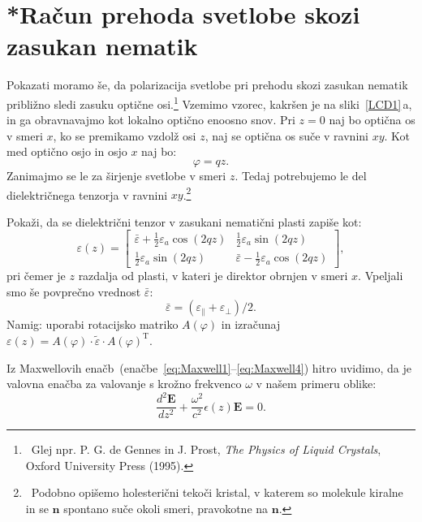 \section{*Račun prehoda svetlobe skozi zasukan nematik}
Pokazati moramo še, da polarizacija svetlobe pri prehodu skozi zasukan nematik 
približno sledi zasuku optične osi.\footnote{~Glej npr. P. G. de Gennes in J. Prost, 
{\it The Physics of Liquid Crystals}, Oxford University Press (1995).}
Vzemimo vzorec, kakršen je na sliki~\ref{LCD1}\,a, in ga obravnavajmo
kot lokalno optično enoosno snov. Pri $z=0$ naj bo optična
os v smeri $x$, ko se premikamo vzdolž osi $z$, naj se optična os suče
v ravnini $xy$. Kot med optično osjo in osjo $x$ naj bo:
\begin{equation}
\varphi=qz.
\label{7.58}
\end{equation}
Zanimajmo se le za širjenje svetlobe v smeri $z$. 
Tedaj potrebujemo le del dielektričnega
tenzorja v ravnini $xy$.\footnote{~Podobno opišemo holesterični tekoči kristal, v
katerem so molekule kiralne in se $\mathbf{n}$ spontano suče okoli
smeri, pravokotne na $\mathbf{n}$.} 

\begin{naloga}
Pokaži, da se dielektrični tenzor v zasukani nematični plasti zapiše kot:
\begin{equation}
\varepsilon (z)=\left[\begin{array}{cc}
\bar{\varepsilon}+\frac{1}{2}\varepsilon_{a}\cos(2qz) & \frac{1}{2}\varepsilon_{a}\sin(2qz)\\
\frac{1}{2}\varepsilon_{a}\sin(2qz) & \bar{\varepsilon}-\frac{1}{2}\varepsilon_{a}\cos(2qz)
\end{array}\right]\!\!,
\label{7.59}
\end{equation}
pri čemer je $z$ razdalja od plasti, v kateri je direktor
obrnjen v smeri $x$. Vpeljali smo še povprečno vrednost $\bar{\varepsilon}$:
\begin{equation}
\bar{\varepsilon}=(\varepsilon_{\parallel}+\varepsilon_{\perp})/2.
\label{7.60}
\end{equation}
Namig: uporabi rotacijsko matriko $A(\varphi)$ in izračunaj  $\varepsilon (z) = A(\varphi) \cdot 
\tilde{\varepsilon} \cdot A(\varphi)^\mathrm{T}$.
\end{naloga}

Iz Maxwellovih enačb~(enačbe~\ref{eq:Maxwell1}--\ref{eq:Maxwell4}) 
hitro uvidimo, da je valovna enačba
za valovanje s krožno frekvenco $\omega$ v našem primeru oblike:
\begin{equation}
\frac{d^{2}\mathbf{E}}{dz^{2}}+\frac{\omega^{2}}{c^{2}} \epsilon
(z)\mathbf{E}=0.
\label{7.61}
\end{equation}

